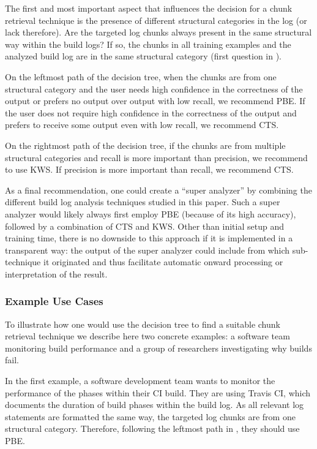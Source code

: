 The first and most important aspect that influences the decision for a
chunk retrieval technique is the presence of different structural
categories in the log (or lack therefore).
Are the targeted log
chunks always present in the same structural way
within the build logs? If so, the chunks
in all training examples and the analyzed build log are in the same
structural category (first question in ).

On the leftmost path of the decision tree,
when the chunks are from one structural category and the user
needs high confidence in the correctness of the output or prefers
no output over output with low recall, we recommend PBE\@.
If the user does not
require high confidence in the correctness of the output and prefers
to receive some output even with low recall, we recommend CTS\@.

On the rightmost path of the decision tree,
if the chunks are from multiple structural categories and recall is
more important than precision, we recommend to use KWS\@.
If precision is more important than recall, we
recommend CTS\@.

As a final recommendation, one could create a ``super analyzer'' by
combining the different build log analysis techniques studied in this
paper.
Such a super analyzer would likely always first employ PBE
(because of its high accuracy), followed by a combination of CTS and
KWS\@.
Other than initial setup and training time, there is no
downside to this approach if it is implemented in a transparent way:
the output of the super analyzer could include from which
sub-technique it originated and thus facilitate automatic onward
processing or interpretation of the result.


\subsubsection{Example Use Cases}
To illustrate how one would use the decision tree to find a suitable
chunk retrieval technique we describe here two concrete examples:
a software team monitoring build performance and a
group of researchers investigating why builds fail.

In the first example, a software development team wants to monitor
the performance of the phases within their CI build.
They are using
Travis CI, which documents the duration of build phases
within the build log.
As all relevant log statements are formatted the same way,
the targeted log chunks are from one structural category.
Therefore, following the leftmost path in
,
they should use PBE.

